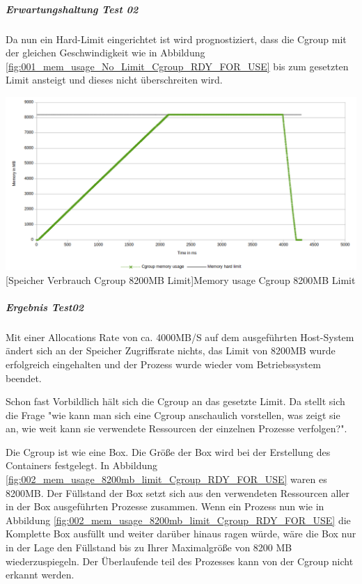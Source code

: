 \subparagraph{Erwartungshaltung Test 02}
Da nun ein Hard-Limit eingerichtet ist wird prognostiziert, dass die Cgroup mit der gleichen Geschwindigkeit wie in Abbildung \ref{fig:001_mem_usage_No_Limit_Cgroup_RDY_FOR_USE} bis zum gesetzten Limit ansteigt und dieses nicht überschreiten wird. 

\vspace{1em}
\begin{minipage}{\linewidth}
	\centering
	\includegraphics[width=1\linewidth]{pics/002_mem_usage_8200mb_limit_Cgroup_RDY_FOR_USE.png}
	[Speicher Verbrauch Cgroup 8200MB Limit]{Memory usage Cgroup 8200MB Limit}
	\label{fig:002_mem_usage_8200mb_limit_Cgroup_RDY_FOR_USE}
\end{minipage}

\subparagraph{Ergebnis Test02}
Mit einer Allocations Rate von ca. 4000MB/S auf dem ausgeführten Host-System ändert sich an der Speicher Zugriffsrate nichts, das Limit von 8200MB wurde erfolgreich eingehalten und der Prozess wurde wieder vom Betriebssystem beendet.

Schon fast Vorbildlich hält sich die Cgroup an das gesetzte Limit. Da stellt sich die Frage "wie kann man sich eine Cgroup anschaulich vorstellen, was zeigt sie an, wie weit kann sie verwendete Ressourcen der einzelnen Prozesse verfolgen?". 


Die Cgroup ist wie eine Box. Die Größe der Box wird bei der Erstellung des Containers festgelegt. In Abbildung \ref{fig:002_mem_usage_8200mb_limit_Cgroup_RDY_FOR_USE} waren es 8200MB. Der Füllstand der Box setzt sich aus den verwendeten Ressourcen aller in der Box ausgeführten Prozesse zusammen. Wenn ein Prozess nun wie in Abbildung \ref{fig:002_mem_usage_8200mb_limit_Cgroup_RDY_FOR_USE} die Komplette Box ausfüllt und weiter darüber hinaus ragen würde, wäre die Box nur in der Lage den Füllstand bis zu Ihrer Maximalgröße von 8200 MB wiederzuspiegeln. Der Überlaufende teil des Prozesses kann von der Cgroup nicht erkannt werden.

